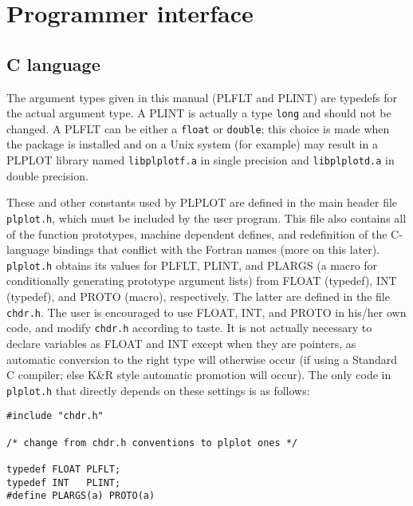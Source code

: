 \chapter{Programmer interface}
\label{ap:lang}

\section {C language}

The argument types given in this manual (PLFLT and PLINT) are typedefs for
the actual argument type.  A PLINT is actually a type {\tt long} and should
not be changed.  A PLFLT can be either a {\tt float} or {\tt double}; this
choice is made when the package is installed and on a Unix system (for
example) may result in a PLPLOT library named {\tt libplplotf.a} in single
precision and {\tt libplplotd.a} in double precision.

These and other constants used by PLPLOT are defined in the main header file
{\tt plplot.h}, which must be included by the user program.  This file also
contains all of the function prototypes, machine dependent defines, and
redefinition of the C-language bindings that conflict with the Fortran names
(more on this later).  {\tt plplot.h} obtains its values for PLFLT, PLINT,
and PLARGS (a macro for conditionally generating prototype argument lists)
from FLOAT (typedef), INT (typedef), and PROTO (macro), respectively.
The latter are defined in the file
{\tt chdr.h}.  The user is encouraged to use FLOAT, INT, and PROTO in
his/her own code, and modify {\tt chdr.h} according to taste.  It is not
actually necessary to declare variables as FLOAT and INT except when they
are pointers, as automatic conversion to the right type will otherwise occur
(if using a Standard C compiler; else K\&R style automatic promotion will
occur).  The only code in {\tt plplot.h} that directly depends on these
settings is as follows:
\begin{verbatim}
#include "chdr.h"

/* change from chdr.h conventions to plplot ones */

typedef FLOAT PLFLT;
typedef INT   PLINT;
#define PLARGS(a) PROTO(a)
\end{verbatim}

